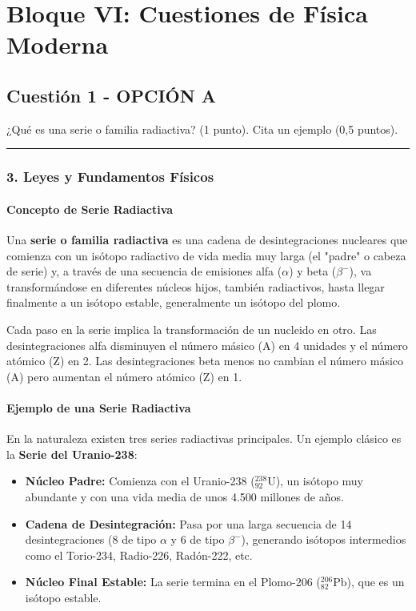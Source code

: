 \newpage

\section{Bloque VI: Cuestiones de Física Moderna}
\label{sec:moderna2_2007_jun_ord}

\subsection{Cuestión 1 - OPCIÓN A}
\label{subsec:6A_2007_jun_ord}

\begin{cajaenunciado}
¿Qué es una serie o familia radiactiva? (1 punto). Cita un ejemplo (0,5 puntos).
\end{cajaenunciado}
\hrule

\subsubsection*{3. Leyes y Fundamentos Físicos}
\paragraph*{Concepto de Serie Radiactiva}
Una \textbf{serie o familia radiactiva} es una cadena de desintegraciones nucleares que comienza con un isótopo radiactivo de vida media muy larga (el "padre" o cabeza de serie) y, a través de una secuencia de emisiones alfa ($\alpha$) y beta ($\beta^-$), va transformándose en diferentes núcleos hijos, también radiactivos, hasta llegar finalmente a un isótopo estable, generalmente un isótopo del plomo.

Cada paso en la serie implica la transformación de un nucleido en otro. Las desintegraciones alfa disminuyen el número másico (A) en 4 unidades y el número atómico (Z) en 2. Las desintegraciones beta menos no cambian el número másico (A) pero aumentan el número atómico (Z) en 1.

\paragraph*{Ejemplo de una Serie Radiactiva}
En la naturaleza existen tres series radiactivas principales. Un ejemplo clásico es la \textbf{Serie del Uranio-238}:
\begin{itemize}
    \item \textbf{Núcleo Padre:} Comienza con el Uranio-238 (${}^{238}_{92}\text{U}$), un isótopo muy abundante y con una vida media de unos 4.500 millones de años.
    \item \textbf{Cadena de Desintegración:} Pasa por una larga secuencia de 14 desintegraciones (8 de tipo $\alpha$ y 6 de tipo $\beta^-$), generando isótopos intermedios como el Torio-234, Radio-226, Radón-222, etc.
    \item \textbf{Núcleo Final Estable:} La serie termina en el Plomo-206 (${}^{206}_{82}\text{Pb}$), que es un isótopo estable.
\end{itemize}

